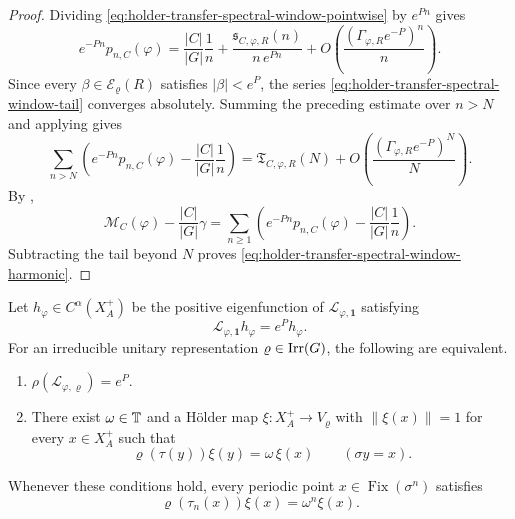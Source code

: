 \begin{proof}
  Dividing \eqref{eq:holder-transfer-spectral-window-pointwise} by
  \(e^{Pn}\) gives
  \[
    e^{-Pn}p_{n,C}(\varphi)
    =
    \frac{|C|}{|G|}\frac{1}{n}
    +\frac{\mathfrak s_{C,\varphi,R}(n)}{n\,e^{Pn}}
    +O\!\left(\frac{(\Gamma_{\varphi,R}e^{-P})^n}{n}\right).
  \]
  Since every \(\beta\in\mathcal E_\varrho(R)\) satisfies
  \(|\beta|<e^P\), the series
  \eqref{eq:holder-transfer-spectral-window-tail} converges absolutely.
  Summing the preceding estimate over \(n>N\) and applying
   gives
  \[
    \sum_{n>N}
      \left(
        e^{-Pn}p_{n,C}(\varphi)
        -\frac{|C|}{|G|}\frac{1}{n}
      \right)
    =
    \mathfrak T_{C,\varphi,R}(N)
    +O\!\left(\frac{(\Gamma_{\varphi,R}e^{-P})^N}{N}\right).
  \]
  By ,
  \[
    \mathcal M_C(\varphi)-\frac{|C|}{|G|}\gamma
    =
    \sum_{n\ge 1}
      \left(
        e^{-Pn}p_{n,C}(\varphi)
        -\frac{|C|}{|G|}\frac{1}{n}
      \right).
  \]
  Subtracting the tail beyond \(N\) proves
  \eqref{eq:holder-transfer-spectral-window-harmonic}.
\end{proof}

\begin{theorem}
  \label{thm:holder-transfer-boundary-rigidity}
  Let \(h_\varphi\in C^\alpha(X_A^+)\) be the positive eigenfunction of
  \(\mathscr L_{\varphi,\mathbf 1}\) satisfying
  \[
    \mathscr L_{\varphi,\mathbf 1}h_\varphi=e^P h_\varphi.
  \]
  For an irreducible unitary representation \(\varrho\in\operatorname{Irr}(G)\), the
  following are equivalent.
  \begin{enumerate}[label=\textup{(\roman*)}]
    \item \(\rho(\mathscr L_{\varphi,\varrho})=e^P\).
    \item There exist \(\omega\in\mathbb{T}\) and a H\"older map
      \(\xi:X_A^+\to V_\varrho\) with \(\|\xi(x)\|=1\) for every
      \(x\in X_A^+\) such that
      \begin{equation}\label{eq:holder-transfer-line-field}
        \varrho(\tau(y))\xi(y)=\omega\,\xi(x)
        \qquad (\sigma y=x).
      \end{equation}
  \end{enumerate}
  Whenever these conditions hold, every periodic point
  \(x\in\operatorname{Fix}(\sigma^n)\) satisfies
  \begin{equation}\label{eq:holder-transfer-periodic-line}
    \varrho(\tau_n(x))\xi(x)=\omega^n\xi(x).
  \end{equation}
\end{theorem}

